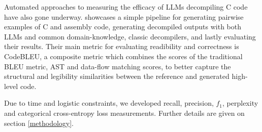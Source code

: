 \documentclass[../main.tex]{subfiles}
\begin{document}
Automated approaches to measuring the efficacy of LLMs decompiling C code have also
gone underway. \cite{vaaden_using_2024} showcases a simple pipeline for generating
pairwise examples of C and assembly code, generating decompiled outputs with both 
LLMs and common domain-knowledge, classic decompilers, and lastly evaluating their
results. Their main metric for evaluating readibility and correctness is CodeBLEU, a
composite metric \cite{ren2020codebleumethodautomaticevaluation} which combines the
scores of the traditional BLEU metric, AST and data-flow matching scores, to better
capture the structural and legibility similarities between the reference and generated
high-level code.

Due to time and logistic constraints, we developed recall, precision, $f_1$, 
perplexity and categorical cross-entropy loss measurements. Further details are
given on section \ref{methodology}.
\end{document}
